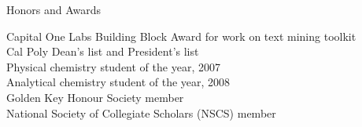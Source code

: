 \documentclass{resume} %
\begin{document}

\begin{rSection}{Honors and Awards}

Capital One Labs Building Block Award for work on text mining toolkit\\
Cal Poly Dean's list and President's list\\
Physical chemistry student of the year, 2007\\
Analytical chemistry student of the year, 2008\\
Golden Key Honour Society member\\
National Society of Collegiate Scholars (NSCS) member

%
%

\end{rSection}


\end{document}
